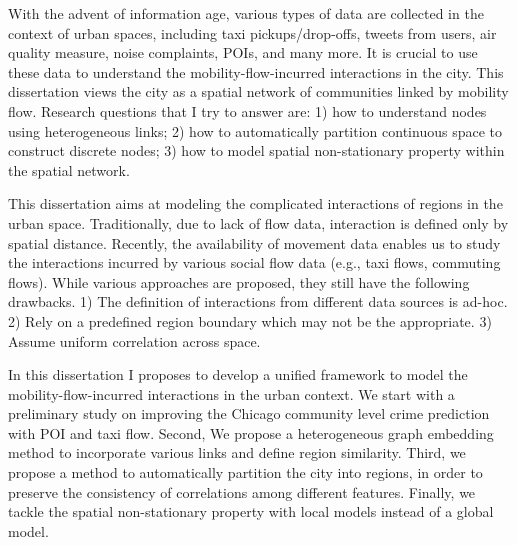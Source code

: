 With the advent of information age, various types of data are collected in the context of urban spaces, including taxi pickups/drop-offs, tweets from users, air quality measure, noise complaints, POIs, and many more. It is crucial to use these data to understand the mobility-flow-incurred interactions in the city. This dissertation views the city as a spatial network of communities linked by mobility flow. Research questions that I try to answer are: 1) how to understand nodes using heterogeneous links; 2) how to automatically partition continuous space to construct discrete nodes; 3) how to model spatial non-stationary property within the spatial network.

This dissertation aims at modeling the complicated interactions of regions in the urban space. Traditionally, due to lack of flow data, interaction is defined only by spatial distance. Recently, the availability of movement data enables us to study the interactions incurred by various social flow data (e.g., taxi flows, commuting flows).  While various approaches are proposed, they still have the following drawbacks. 1) The definition of interactions from different data sources is ad-hoc. 2) Rely on a predefined region boundary which may not be the appropriate. 3) Assume uniform correlation across space.
 
In this dissertation I proposes to develop a unified framework to model the mobility-flow-incurred interactions in the urban context. We start with a preliminary study on improving the Chicago community level crime prediction with POI and taxi flow. Second, We propose a heterogeneous graph embedding method to incorporate various links and define region similarity. Third, we propose a method to automatically partition the city into regions, in order to preserve the consistency of correlations among different features. Finally, we tackle the spatial non-stationary property with local models instead of a global model. 





